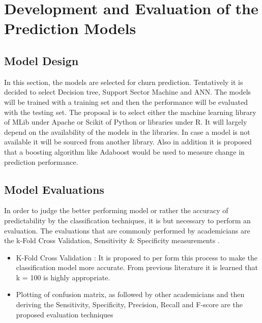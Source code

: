 \newpage
\section{Development and Evaluation of the Prediction Models}
\subsection{Model Design}
In this section, the models are selected for churn prediction. Tentatively it is decided to select Decision tree, Support Sector Machine and ANN. The models will be trained with a training set and then the performance will be evaluated with the testing set. The proposal is to select either the machine learning library of MLib under Apache or Scikit of Python or libraries under R. It will largely depend on the availability of the models in the libraries. In case a model is not available it will be sourced from another library. Also in addition it is proposed that a boosting algorithm like Adaboost would be used to measure change in prediction performance.

\subsection{Model Evaluations}
In order to judge the better performing model or rather the accuracy of predictability by the classification techniques, it is but necessary to perform an evaluation. The evaluations that are commonly performed by academicians are the k-Fold Cross Validation, Sensitivity \& Specificity measurements .\\
\begin{itemize}
	\item K-Fold Cross Validation : It is proposed to per form this process to make the classification model more accurate. From previous literature it is learned that k = 100 is highly appropriate.
	\item Plotting of confusion matrix, as followed by other academicians and then deriving the Sensitivity, Specificity, Precision, Recall and F-score are the proposed evaluation techniques
\end{itemize}

\newpage
